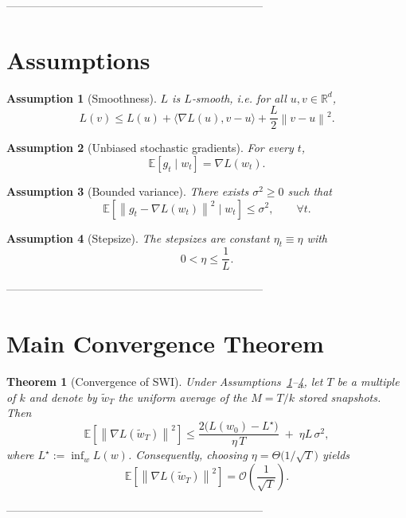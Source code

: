 \documentclass{article}
\newtheorem{theorem}{Theorem}
\newtheorem{assumption}{Assumption}
\newcommand{\E}{\mathbb{E}}
\newcommand{\R}{\mathbb{R}}
\newcommand{\norm}[1]{\left\lVert #1\right\rVert}
\begin{document}
---------------------------------------------------------------------

\section*{Assumptions}
\begin{assumption}[Smoothness]\label{as:smooth}
$L$ is $L$‑smooth, i.e. for all $u,v\in\R^d$,
\[
L(v)\le L(u)+\langle\nabla L(u),v-u\rangle+\frac{L}{2}\norm{v-u}^2 .
\]
\end{assumption}

\begin{assumption}[Unbiased stochastic gradients]\label{as:unbiased}
For every $t$,
\[
\E[g_t\mid w_t]=\nabla L(w_t).
\]
\end{assumption}

\begin{assumption}[Bounded variance]\label{as:variance}
There exists $\sigma^2\ge0$ such that
\[
\E\!\left[\norm{g_t-\nabla L(w_t)}^2\mid w_t\right]\le\sigma^2,\qquad\forall t .
\]
\end{assumption}

\begin{assumption}[Stepsize]\label{as:stepsize}
The stepsizes are constant $\eta_t\equiv\eta$ with 
\[
0<\eta\le\frac{1}{L}.
\]
\end{assumption}

---------------------------------------------------------------------

\section*{Main Convergence Theorem}
\begin{theorem}[Convergence of SWI]\label{thm:main}
Under Assumptions~\ref{as:smooth}–\ref{as:stepsize}, let $T$ be a multiple of $k$ and denote by $\widetilde w_T$ the uniform average of the $M=T/k$ stored snapshots. Then
\[
\boxed{
\E\!\left[\norm{\nabla L(\widetilde w_T)}^2\right]\le
\frac{2\big(L(w_0)-L^\star\big)}{\eta\,T}
\;+\; \eta L\,\sigma^2 ,
}
\]
where $L^\star:=\inf_{w}L(w)$. Consequently, choosing $\eta =\Theta\!\bigl(1/\sqrt{T}\bigr)$ yields
\[
\E\!\left[\norm{\nabla L(\widetilde w_T)}^2\right]=\mathcal{O}\!\left(\frac{1}{\sqrt{T}}\right).
\]
\end{theorem}

---------------------------------------------------------------------
\end{document}

